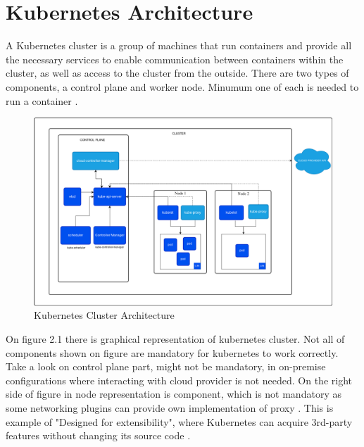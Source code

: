 
\section{Kubernetes Architecture}
\label{sec:k8s_arch}
A Kubernetes cluster is a group of machines that run containers and provide all the necessary services to enable communication between containers within the cluster, as well as access to the cluster from the outside. There are two types of components, a control plane and worker node. Minumum one of each is needed to run a container \cite{KubernetesArch}. 

\begin{figure}[tbh]
    \centering
    \includegraphics[width=1\columnwidth]{images/kubernetes-cluster-architecture.png}
    \caption{Kubernetes Cluster Architecture \cite{KubernetesArch}}
    \label{fig:testsvg}
\end{figure}

On figure 2.1 there is graphical representation of kubernetes cluster. Not all of components shown on figure are mandatory for kubernetes to work correctly. Take a look on control plane part, \textit{} might not be mandatory, in on-premise configurations where interacting with cloud provider is not needed. On the right side of figure in node representation is \textit{} component, which is not mandatory as some networking plugins can provide own implementation of proxy \cite{KubernetesArch}. This is example of "Designed for extensibility", where Kubernetes can acquire 3rd-party features without changing its source code \cite{KubernetesDocs}.

